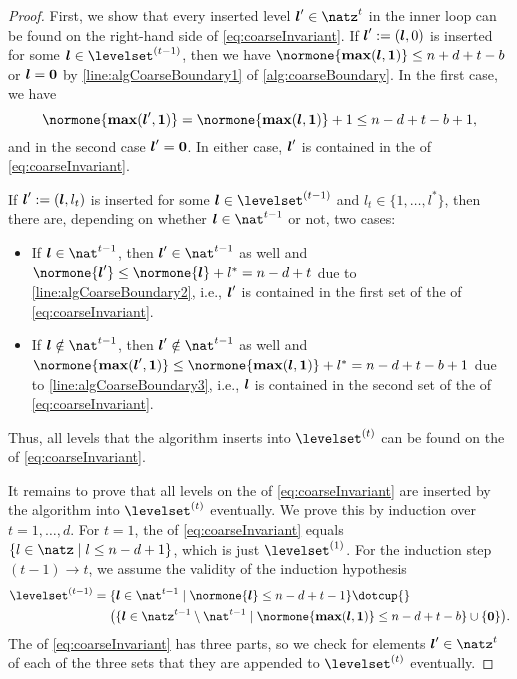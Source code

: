 \begin{proof}
  First, we show that every inserted level $\*l' \in \natz^t$ in the inner loop
  can be found on the right-hand side of \eqref{eq:coarseInvariant}.
  If ${\boldsymbol{l}}' := ({\boldsymbol{l}}, 0)$
  is inserted for some $\*l \in \levelset^{(t-1)}$,
  then we have $\normone{\vecmax(\*l, \*1)} \le n+d+t-b$ or
  ${\boldsymbol{l}} = {\boldsymbol{0}}$ by \cref{line:algCoarseBoundary1} of
  \cref{alg:coarseBoundary}.
  In the first case, we have
  \begin{equation}
    \normone{\vecmax(\*l', \*1)}
    = \normone{\vecmax(\*l, \*1)} + 1
    \le n - d + t - b + 1,
  \end{equation}
  and in the second case ${\boldsymbol{l}}' = {\boldsymbol{0}}$.
  In either case, ${\boldsymbol{l}}'$ is contained in the \rhs of
  \eqref{eq:coarseInvariant}.
  
  If ${\boldsymbol{l}}' := ({\boldsymbol{l}}, l_t)$ is inserted
  for some $\*l \in \levelset^{(t-1)}$ and
  $l_t \in \{1, \dotsc, l^\ast\}$, then there are,
  depending on whether $\*l \in \nat^{t-1}$ or not, two cases:
  \begin{itemize}
    \item
    If $\*l \in \nat^{t-1}$, then $\*l' \in \nat^{t-1}$ as well and
    $\normone{\*l'} \le \normone{\*l} + l^\ast = n - d + t$
    due to \cref{line:algCoarseBoundary2},
    i.e., ${\boldsymbol{l}}'$ is contained in the first set of the \rhs of
    \eqref{eq:coarseInvariant}.
    
    \item
    If $\*l \notin \nat^{t-1}$, then $\*l' \notin \nat^{t-1}$ as well and
    $\normone{\vecmax(\*l', \*1)}
    \le \normone{\vecmax(\*l, \*1)} + l^\ast
    = n - d + t - b + 1$
    due to \cref{line:algCoarseBoundary3},
    i.e., ${\boldsymbol{l}}$ is contained in the second set of the \rhs of
    \eqref{eq:coarseInvariant}.
  \end{itemize}
  Thus, all levels that the algorithm inserts into $\levelset^{(t)}$
  can be found on the \rhs of \eqref{eq:coarseInvariant}.
  
  It remains to prove that all levels on the \rhs of
  \eqref{eq:coarseInvariant}
  are inserted by the algorithm into $\levelset^{(t)}$ eventually.
  We prove this by induction over $t = 1, \dotsc, d$.
  For $t = 1$, the \rhs of \eqref{eq:coarseInvariant} equals
  $\{l \in \natz \mid l \le n-d+1\}$, which is just $\levelset^{(1)}$.
  For the induction step $(t - 1) \to t$, we assume
  the validity of the induction hypothesis
  \begin{equation}
    \label{eq:proofCoarseInductionHypothesis}
    \begin{aligned}
    \levelset^{(t-1)}
    &= \{\*l \in \nat^{t-1} \mid
    \normone{\*l} \le n-d+t-1\} \dotcup {}\\
    &\hphantom{{}={}}
    \big(\{\*l \in \natz^{t-1} \setminus \nat^{t-1} \mid
    \normone{\vecmax(\*l, \*1)} \le n-d+t-b\} \cup
    \{\vec{0}\}\big).
    \end{aligned}
  \end{equation}
  The \rhs of \eqref{eq:coarseInvariant} has three parts,
  so we check for elements $\*l' \in \natz^t$
  of each of the three sets that they are appended to $\levelset^{(t)}$
  eventually.
  

\end{proof}
